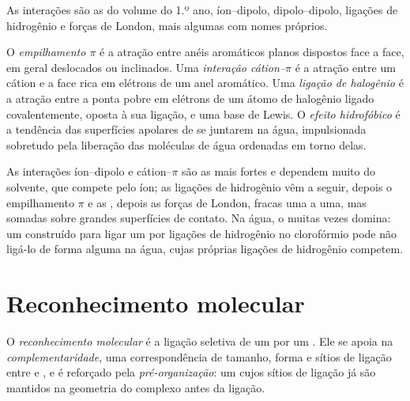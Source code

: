 As interações são as do volume do 1.º ano, íon--dipolo, dipolo--dipolo,
ligações de hidrogênio e forças de London, mais algumas com nomes próprios.

\begin{definition}\label{def:b3:supramolecular:interactions}
O \emph{empilhamento $\pi$} é a atração entre anéis aromáticos planos
dispostos face a face, em geral deslocados ou inclinados. Uma \emph{interação
cátion--$\pi$} é a atração entre um cátion e
a face rica em elétrons de um anel aromático. Uma \emph{ligação de halogênio}
é a atração entre a ponta pobre em elétrons de um átomo de halogênio ligado
covalentemente, oposta à sua ligação, e uma base de Lewis. O \emph{efeito
hidrofóbico} é a tendência das superfícies apolares de se
juntarem na água, impulsionada sobretudo pela liberação das moléculas de água ordenadas
em torno delas.
\end{definition}

As interações íon--dipolo e cátion--$\pi$ são as mais fortes e dependem
muito do solvente, que compete pelo íon; as ligações de hidrogênio vêm a seguir,
depois o empilhamento $\pi$ e as , depois as forças de London, fracas uma a uma, mas
somadas sobre grandes superfícies de contato. Na água, o  muitas vezes
domina: um  construído para ligar um  por ligações de hidrogênio no clorofórmio pode não
ligá-lo de forma alguma na água, cujas próprias ligações de hidrogênio competem.

\section{Reconhecimento molecular}

\begin{definition}\label{def:b3:supramolecular:recognition}
O \emph{reconhecimento molecular} é a ligação
seletiva de um  por um . Ele se apoia na \emph{complementaridade},
uma correspondência de tamanho, forma e sítios de ligação entre  e , e é
reforçado pela \emph{pré-organização}: um  cujos
sítios de ligação já são mantidos na geometria do complexo antes da ligação.
\end{definition}

